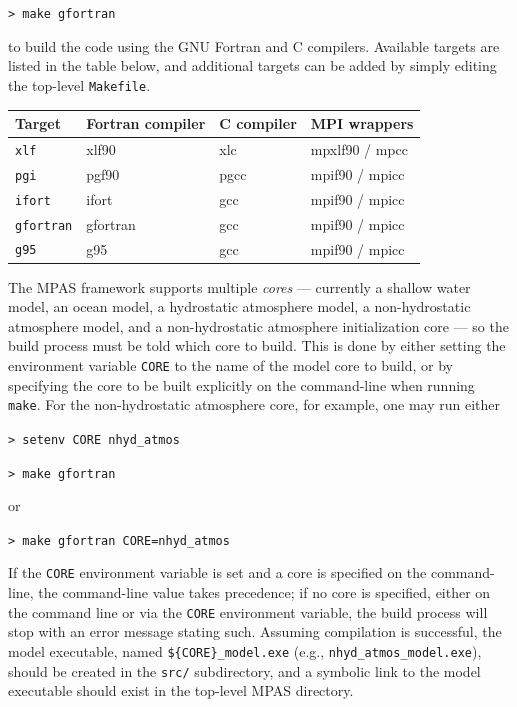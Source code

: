 \documentclass[11pt]{report}
\begin{document}
\vspace{12pt}
{\tt > make gfortran}
\vspace{12pt}

\noindent to build the code using the GNU Fortran and C compilers. Available targets are listed in the table below, and additional
targets can be added by simply editing the top-level {\tt Makefile}.

\vspace{12pt}
\begin{longtable}{| l | l | l | l |}
\hline
Target & Fortran compiler & C compiler & MPI wrappers \\ \hline \hline
{\tt xlf} & xlf90 & xlc & mpxlf90 / mpcc \\ \hline
{\tt pgi} & pgf90 & pgcc & mpif90 / mpicc \\ \hline
{\tt ifort} & ifort & gcc & mpif90 / mpicc \\ \hline
{\tt gfortran} & gfortran & gcc & mpif90 / mpicc \\ \hline
{\tt g95} & g95 & gcc & mpif90 / mpicc \\ \hline
\end{longtable}
\vspace{12pt}

The MPAS framework supports multiple {\em cores} --- currently a shallow water
model, an ocean model, a hydrostatic atmosphere model, a non-hydrostatic atmosphere model, and a non-hydrostatic atmosphere initialization core --- so the build
process must be told which core to build. This is done by either setting the environment variable
{\tt CORE} to the name of the model core to build, or by specifying the core to be built explicitly on the command-line
when running {\tt make}. For the non-hydrostatic atmosphere core, for example, one may run either

\vspace{12pt}
{\tt > setenv CORE nhyd\_atmos}

{\tt > make gfortran}
\vspace{12pt}

\noindent or

\vspace{12pt}
{\tt > make gfortran CORE=nhyd\_atmos}
\vspace{12pt}

If the {\tt CORE} environment variable is set and a core is specified on the command-line, the command-line value takes precedence; if no core
is specified, either on the command line or via the {\tt CORE} environment variable, the build process will stop with an error message stating such.
Assuming compilation is successful, the model executable, named {\tt \$\{CORE\}\_model.exe} (e.g., {\tt nhyd\_atmos\_model.exe}), should
be created in the {\tt src/} subdirectory, and a symbolic link to the model executable 
should exist in the top-level MPAS directory.
\end{document}
